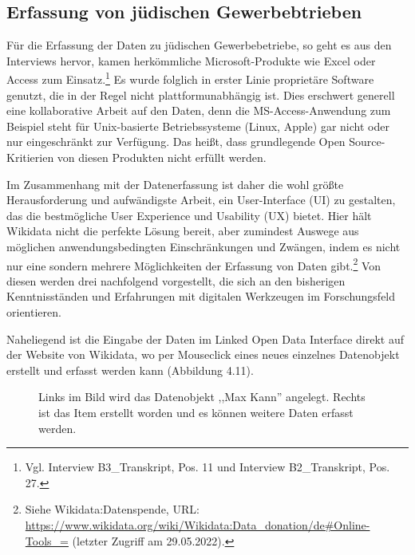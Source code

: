 \subsection{Erfassung von jüdischen Gewerbebtrieben}

Für die Erfassung der Daten zu jüdischen Gewerbebetriebe, so geht es aus den Interviews hervor, kamen herkömmliche Microsoft-Produkte wie Excel oder Access zum Einsatz.\footnote{Vgl. Interview B3\_Transkript, Pos. 11 und Interview B2\_Transkript, Pos. 27.} Es wurde folglich in erster Linie proprietäre Software genutzt, die in der Regel nicht plattformunabhängig ist. Dies erschwert generell eine kollaborative Arbeit auf den Daten, denn die MS-Access-Anwendung zum Beispiel steht für Unix-basierte Betriebssysteme (Linux, Apple) gar nicht oder nur eingeschränkt zur Verfügung. Das heißt, dass grundlegende Open Source-Kritierien von diesen Produkten nicht erfüllt werden. 

Im Zusammenhang mit der Datenerfassung ist daher die wohl größte Herausforderung und aufwändigste Arbeit, ein User-Interface (UI) zu gestalten, das die bestmögliche User Experience und Usability (UX) bietet. Hier hält Wikidata nicht die perfekte Lösung bereit, aber zumindest Auswege aus möglichen anwendungsbedingten Einschränkungen und Zwängen, indem es nicht nur eine sondern mehrere Möglichkeiten der Erfassung von Daten gibt.\footnote{Siehe Wikidata:Datenspende, URL: \url{https://www.wikidata.org/wiki/Wikidata:Data\_donation/de\#Online-Tools\_=} (letzter Zugriff am 29.05.2022).} Von diesen werden drei nachfolgend vorgestellt, die sich an den bisherigen Kenntnisständen und Erfahrungen mit digitalen Werkzeugen im Forschungsfeld orientieren. 

Naheliegend ist die Eingabe der Daten im Linked Open Data Interface direkt auf der Website von Wikidata, wo per Mouseclick eines neues einzelnes Datenobjekt erstellt und erfasst werden kann (Abbildung 4.11). 

\begin{figure}[h]
    \centering
    \caption{Links im Bild wird das Datenobjekt ,,Max Kann'' angelegt. Rechts ist das Item erstellt worden und es können weitere Daten erfasst werden.}
    \label{fig:x cubed graph}
\end{figure}

